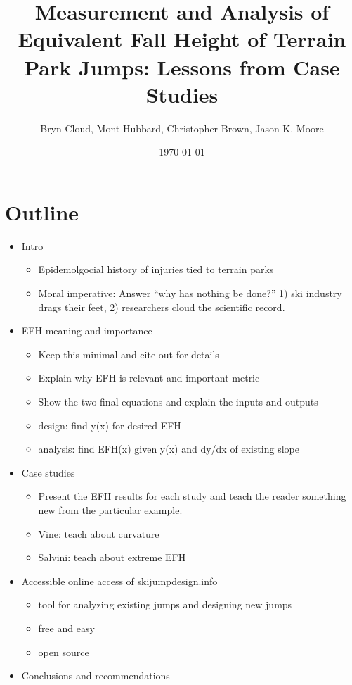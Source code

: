 \documentclass{article}
\title{Measurement and Analysis of Equivalent Fall Height of Terrain Park
  Jumps: Lessons from Case Studies}
\author{Bryn Cloud, Mont Hubbard, Christopher Brown, Jason K. Moore}
\date{\today}
\begin{document}
\maketitle

\section*{Outline}
%
\begin{itemize}
  \item Intro
  \begin{itemize}
    \item Epidemolgocial history of injuries tied to terrain parks
    \item Moral imperative: Answer ``why has nothing be done?'' 1) ski industry
      drags their feet, 2) researchers cloud the scientific record.
  \end{itemize}
  \item EFH meaning and importance
  \begin{itemize}
    \item Keep this minimal and cite out for details
    \item Explain why EFH is relevant and important metric
    \item Show the two final equations and explain the inputs and outputs
    \item design: find y(x) for desired EFH
    \item analysis: find EFH(x) given y(x) and dy/dx of existing slope
  \end{itemize}
  \item Case studies
  \begin{itemize}
    \item Present the EFH results for each study and teach the reader something
      new from the particular example.
    \item Vine: teach about curvature
    \item Salvini: teach about extreme EFH
  \end{itemize}
  \item Accessible online access of skijumpdesign.info
  \begin{itemize}
    \item tool for analyzing existing jumps and designing new jumps
    \item free and easy
    \item open source
  \end{itemize}
  \item Conclusions and recommendations

\end{itemize}
\end{document}
